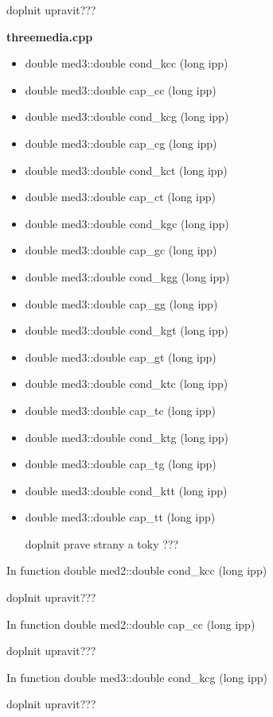 doplnit upravit???


{\bf threemedia.cpp}\\
\begin{itemize}
\item {\sf double med3::double cond\_kcc (long ipp)}
\item {\sf double med3::double cap\_cc (long ipp)}
\item {\sf double med3::double cond\_kcg (long ipp)}
\item {\sf double med3::double cap\_cg (long ipp)}
\item {\sf double med3::double cond\_kct (long ipp)}
\item {\sf double med3::double cap\_ct (long ipp)}

\item {\sf double med3::double cond\_kgc (long ipp)}
\item {\sf double med3::double cap\_gc (long ipp)}
\item {\sf double med3::double cond\_kgg (long ipp)}
\item {\sf double med3::double cap\_gg (long ipp)}
\item {\sf double med3::double cond\_kgt (long ipp)}
\item {\sf double med3::double cap\_gt (long ipp)}

\item {\sf double med3::double cond\_ktc (long ipp)}
\item {\sf double med3::double cap\_tc (long ipp)}
\item {\sf double med3::double cond\_ktg (long ipp)}
\item {\sf double med3::double cap\_tg (long ipp)}
\item {\sf double med3::double cond\_ktt (long ipp)}
\item {\sf double med3::double cap\_tt (long ipp)}

doplnit prave strany a toky ???

\end{itemize}



In function {\sf double med2::double cond\_kcc (long ipp)}

doplnit upravit???


In function {\sf double med2::double cap\_cc (long ipp)}

doplnit upravit???

In function {\sf double med3::double cond\_kcg (long ipp)}

doplnit upravit???

